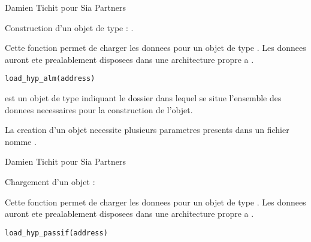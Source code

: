 \documentclass[a4paper]{book}
\begin{document}
%
\begin{Author}\relax
Damien Tichit pour Sia Partners
\end{Author}
%
\begin{SeeAlso}\relax
Construction d'un objet de type  : .
\end{SeeAlso}
%
\begin{Description}\relax
Cette fonction permet de charger les donnees pour un objet de type . Les donnees auront ete prealablement disposees dans
une architecture propre a .
\end{Description}
%
\begin{Usage}
\begin{verbatim}
load_hyp_alm(address)
\end{verbatim}
\end{Usage}
%
\begin{Arguments}
\begin{ldescription}
\item[\code{address}] est un objet de type  indiquant le dossier dans lequel se situe l'ensemble des donnees necessaires
pour la construction de l'objet.
\end{ldescription}
\end{Arguments}
%
\begin{Details}\relax
La creation d'un objet  necessite plusieurs parametres presents dans un fichier nomme .
\end{Details}
%
\begin{Author}\relax
Damien Tichit pour Sia Partners
\end{Author}
%
\begin{SeeAlso}\relax
Chargement d'un objet  : 
\end{SeeAlso}
%
\begin{Description}\relax
Cette fonction permet de charger les donnees pour un objet de type . Les donnees auront ete prealablement disposees dans
une architecture propre a .
\end{Description}
%
\begin{Usage}
\begin{verbatim}
load_hyp_passif(address)
\end{verbatim}
\end{Usage}
\end{document}
